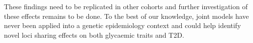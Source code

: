 \documentclass[11pt, a4paper]{article}
\begin{document}
\par{
These findings need to be replicated in other cohorts and further investigation of these effects remains to be done.
To the best of our knowledge, joint models have never been applied into a genetic epidemiology context and could help identify novel loci sharing effects on both glycaemic traits and T2D.
}
\end{document}
